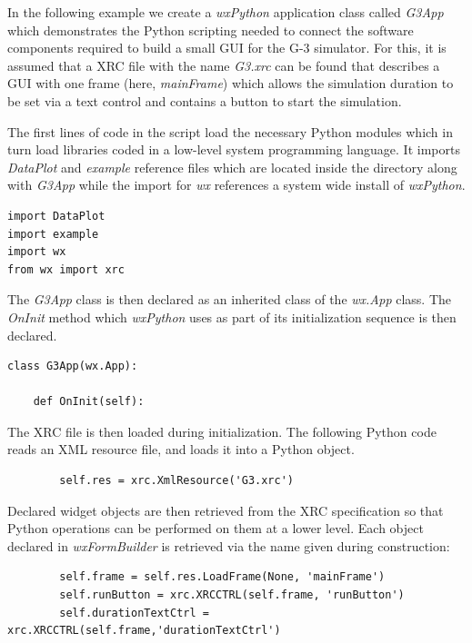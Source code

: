 \documentclass[12pt]{article}
\begin{document}
In the following example we create a {\it wxPython} application class 
called {\it G3App} which demonstrates the Python scripting needed to 
connect the software components required to build a small GUI for 
the G-3 simulator.  For this, it is assumed that a XRC file with the name
{\it G3.xrc} can be found that describes a GUI with one frame (here,
{\it mainFrame}) which allows the simulation duration to be set via a
text control and contains a button to start the simulation.

The first lines of code in the script load the necessary Python
modules which in turn load libraries coded in a low-level system
programming language. It imports {\it DataPlot} and {\it example} 
reference files which are located inside the directory along with {\it G3App} while 
the import for {\it wx} references a system wide install of {\it wxPython}.

{\footnotesize
  \resetlinenumber
  \linenumbers
\begin{verbatim}
import DataPlot
import example
import wx
from wx import xrc
\end{verbatim}
}

The  {\it G3App} class is then declared as an inherited class of the {\it wx.App} class. The {\it OnInit} method which {\it wxPython} uses as part of its
initialization sequence is then declared.

{\footnotesize
   \resetlinenumber[8]
   \linenumbers
 \begin{verbatim}
class G3App(wx.App):

    def OnInit(self):
 \end{verbatim}
}

The XRC file is then loaded during initialization.
The following Python code reads an XML resource file, and loads it
into a Python object.

{\footnotesize
   \resetlinenumber[13]
   \linenumbers
 \begin{verbatim}
        self.res = xrc.XmlResource('G3.xrc')
 \end{verbatim}
}

Declared widget objects are then retrieved from the XRC 
specification so that Python operations can be performed on them at a 
lower level. Each object declared in {\it wxFormBuilder} is retrieved 
via the name given during construction:

{\footnotesize
   \resetlinenumber[18]
   \linenumbers
 \begin{verbatim}
        self.frame = self.res.LoadFrame(None, 'mainFrame')
        self.runButton = xrc.XRCCTRL(self.frame, 'runButton')
        self.durationTextCtrl = xrc.XRCCTRL(self.frame,'durationTextCtrl')
 \end{verbatim}
}
\end{document}
